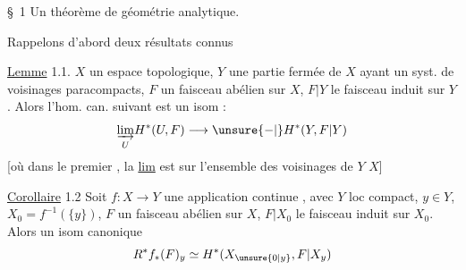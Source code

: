 \S~1 Un théorème de géométrie analytique.

Rappelons d'abord deux résultats connus

\uline{Lemme} 1.1.  $X$ un espace  topologique, $Y$
une partie fermée de $X$ ayant un syst. 
de voisinages paracompacts, $F$ un faisceau abélien
sur $X$, $F|Y$ le faisceau induit sur $Y$. Alors
l'hom. can.  suivant est un isom :
\[
\underset{U}{\underrightarrow{\lim}}H^*(U,F)\longrightarrow\unsure{-|\vphantom{-}}H^*(Y,F|Y)
\]
[où dans le premier , la \uline{lim} est sur
l'ensemble des voisinages de $Y$  $X$]

\uline{Corollaire} 1.2 Soit $f:X\to Y$ une application
continue , avec $Y$ loc compact,
 $y\in Y$, $X_0=f^{-1}(\{y\})$, $F$ un faisceau
abélien sur $X$, $F|X_0$ le faisceau induit
sur $X_0$. Alors  un isom
canonique
\[
R^*f_{*}(F)_y\simeq H^*(X_{\unsure{0|y}},F|X_y)
\]
